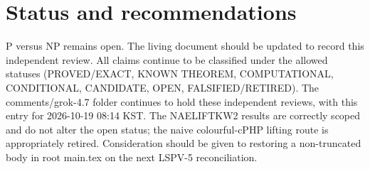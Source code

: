 \documentclass[11pt]{article}
\begin{document}
\section{Status and recommendations}
P versus NP remains open. The living document should be updated to record this independent review. All claims continue to be classified under the allowed statuses (PROVED/EXACT, KNOWN THEOREM, COMPUTATIONAL, CONDITIONAL, CANDIDATE, OPEN, FALSIFIED/RETIRED). The comments/grok-4.7 folder continues to hold these independent reviews, with this entry for 2026-10-19 08:14 KST. The NAELIFTKW2 results are correctly scoped and do not alter the open status; the naive colourful-cPHP lifting route is appropriately retired. Consideration should be given to restoring a non-truncated body in root main.tex on the next LSPV-5 reconciliation.

\end{document}
